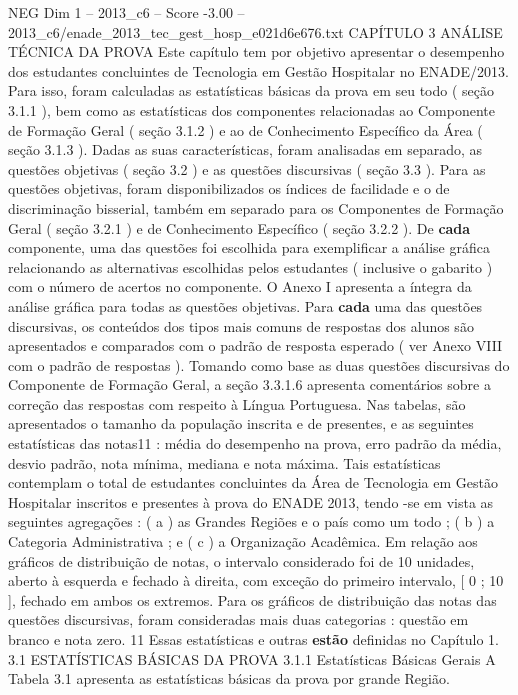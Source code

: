 \begin{textsample}{NEG Dim 1 – 2013\_c6 – Score -3.00 – 2013\_c6/enade\_2013\_tec\_gest\_hosp\_e021d6e676.txt}  \label{ex:f1_neg_261}
CAPÍTULO 3 ANÁLISE TÉCNICA DA PROVA Este capítulo tem por objetivo apresentar o desempenho dos estudantes concluintes de Tecnologia em Gestão Hospitalar no ENADE/2013.
Para isso, foram calculadas as estatísticas básicas da prova em seu todo ( seção 3.1.1 ), bem como as estatísticas dos componentes relacionadas ao Componente de Formação Geral ( seção 3.1.2 ) e ao de Conhecimento Específico da Área ( seção 3.1.3 ).
Dadas as suas características, foram analisadas em separado, as questões objetivas ( seção 3.2 ) e as questões discursivas ( seção 3.3 ).
Para as questões objetivas, foram disponibilizados os índices de facilidade e o de discriminação bisserial, também em separado para os Componentes de Formação Geral ( seção 3.2.1 ) e de Conhecimento Específico ( seção 3.2.2 ).
De \textbf{cada} componente, uma das questões foi escolhida para exemplificar a análise gráfica relacionando as alternativas escolhidas pelos estudantes ( inclusive o gabarito ) com o número de acertos no componente.
O Anexo I apresenta a íntegra da análise gráfica para todas as questões objetivas.
Para \textbf{cada} uma das questões discursivas, os conteúdos dos tipos mais comuns de respostas dos alunos são apresentados e comparados com o padrão de resposta esperado ( ver Anexo VIII com o padrão de respostas ).
Tomando como base as duas questões discursivas do Componente de Formação Geral, a seção 3.3.1.6 apresenta comentários sobre a correção das respostas com respeito à Língua Portuguesa.
Nas tabelas, são apresentados o tamanho da população inscrita e de presentes, e as seguintes estatísticas das notas11 : média do desempenho na prova, erro padrão da média, desvio padrão, nota mínima, mediana e nota máxima.
Tais estatísticas contemplam o total de estudantes concluintes da Área de Tecnologia em Gestão Hospitalar inscritos e presentes à prova do ENADE 2013, tendo -se em vista as seguintes agregações : ( a ) as Grandes Regiões e o país como um todo ; ( b ) a Categoria Administrativa ; e ( c ) a Organização Acadêmica.
Em relação aos gráficos de distribuição de notas, o intervalo considerado foi de 10 unidades, aberto à esquerda e fechado à direita, com exceção do primeiro intervalo, [ 0 ; 10 ], fechado em ambos os extremos.
Para os gráficos de distribuição das notas das questões discursivas, foram consideradas mais duas categorias : questão em branco e nota zero. 11 Essas estatísticas e outras \textbf{estão} definidas no Capítulo 1. 3.1 ESTATÍSTICAS BÁSICAS DA PROVA 3.1.1 Estatísticas Básicas Gerais A Tabela 3.1 apresenta as estatísticas básicas da prova por grande Região.

\end{textsample}
